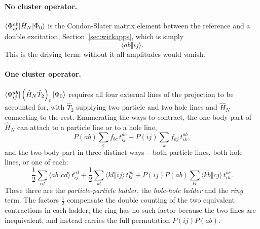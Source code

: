 \paragraph{No cluster operator.}
$\langle \Phi_{ij}^{ab} | \hat{H}_N | \Phi_0 \rangle$ is the Condon-Slater matrix
element between the reference and a double excitation,
Section~\ref{sec:wickapps}, which is simply
\begin{equation}
  \langle ab\Vert ij\rangle .
  \label{eq:10-ccd0}
\end{equation}
This is the driving term: without it all amplitudes would vanish.

\paragraph{One cluster operator.}
$\langle \Phi_{ij}^{ab} | \left(\hat{H}_N\hat{T}_2\right)_c | \Phi_0 \rangle$
requires all four external lines of the projection to be accounted for, with
$\hat{T}_2$ supplying two particle and two hole lines and $\hat{H}_N$
connecting to the rest.  Enumerating the ways to contract, the one-body part
of $\hat{H}_N$ can attach to a particle line or to a hole line,
\begin{equation}
  P(ab)\sum_c f_{bc}\,t_{ij}^{ac}
  - P(ij)\sum_k f_{kj}\,t_{ik}^{ab},
  \label{eq:10-ccd1a}
\end{equation}
and the two-body part in three distinct ways -- both particle lines, both hole
lines, or one of each:
\begin{equation}
  \frac{1}{2}\sum_{cd}\langle ab\Vert cd\rangle\,t_{ij}^{cd}
  + \frac{1}{2}\sum_{kl}\langle kl\Vert ij\rangle\,t_{kl}^{ab}
  + P(ij)P(ab)\sum_{kc}\langle kb\Vert cj\rangle\,t_{ik}^{ac}.
  \label{eq:10-ccd1b}
\end{equation}
These three are the \emph{particle-particle ladder}, the \emph{hole-hole
ladder} and the \emph{ring} term.  The factors $\tfrac12$ compensate the
double counting of the two equivalent contractions in each ladder; the ring
has no such factor because the two lines are inequivalent, and instead
carries the full permutation $P(ij)P(ab)$.


